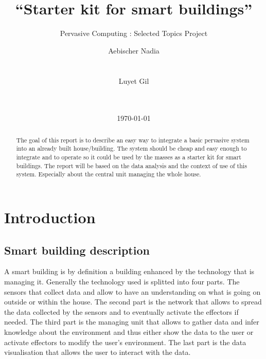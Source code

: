 \documentclass{acm_proc_article-sp}
\begin{document}
\graphicspath{{figures/}}

\title{“Starter kit for smart buildings”}
\subtitle{Pervasive Computing : Selected Topics Project}

%
\author{
\alignauthor 
  Aebischer Nadia
  \\
  \\
  \\
\alignauthor 
  Luyet Gil
  \\
  \\
  \\
}
\date{\today}

\maketitle
\begin{abstract}
The goal of this report is to describe an easy way to integrate a basic pervasive system into an already built house/building. 
The system should be cheap and easy enough to integrate and to operate so it could be used by the masses as a starter kit for smart buildings. 
The report will be based on the data analysis and the context of use of this system. 
Especially about the central unit managing the whole house.
\end{abstract}


\section{Introduction}
\subsection{Smart building description}
A smart building is by definition a building enhanced by the technology that is managing it. 
Generally the technology used is splitted into four parts. 
The sensors that collect data and allow to have an understanding on what is going on outside or within the house. 
The second part is the network that allows to spread the data collected by the sensors and to eventually activate the effectors if needed. 
The third part is the managing unit that allows to gather data and infer knowledge about the environment and thus either show the data to the user or activate effectors to modify the user’s environment. 
The last part is the data visualisation that allows the user to interact with the data.
\end{document}
